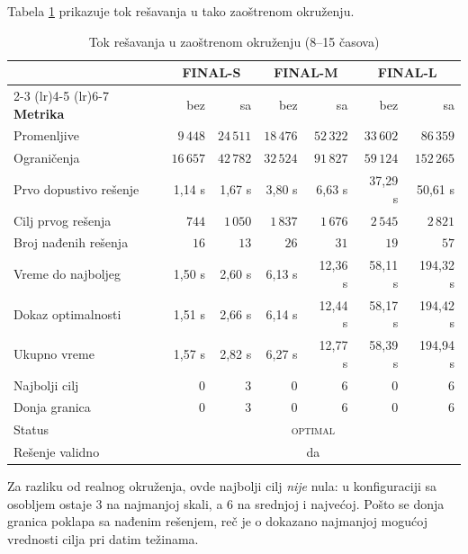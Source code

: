 \documentclass[12pt,oneside]{memoir}
\begin{document}
Tabela \ref{tbl:tight_tok} prikazuje tok rešavanja u tako zaoštrenom
okruženju.

\begin{table}[ht]
\centering
\caption{Tok rešavanja u zaoštrenom okruženju (8--15 časova)}
\label{tbl:tight_tok}
\begin{tabular}{lrrrrrr}
\toprule
& \multicolumn{2}{c}{\textbf{FINAL-S}}
& \multicolumn{2}{c}{\textbf{FINAL-M}}
& \multicolumn{2}{c}{\textbf{FINAL-L}} \\
\cmidrule(lr){2-3} \cmidrule(lr){4-5} \cmidrule(lr){6-7}
\textbf{Metrika} & bez & sa & bez & sa & bez & sa \\
\midrule
Promenljive            & $9\,448$  & $24\,511$ & $18\,476$ & $52\,322$ & $33\,602$ & $86\,359$ \\
Ograničenja            & $16\,657$ & $42\,782$ & $32\,524$ & $91\,827$ & $59\,124$ & $152\,265$ \\
Prvo dopustivo rešenje & 1,14 s    & 1,67 s    & 3,80 s    & 6,63 s    & 37,29 s   & 50,61 s \\
Cilj prvog rešenja     & $744$     & $1\,050$  & $1\,837$  & $1\,676$  & $2\,545$  & $2\,821$ \\
Broj nađenih rešenja   & $16$      & $13$      & $26$      & $31$      & $19$      & $57$ \\
Vreme do najboljeg     & 1,50 s    & 2,60 s    & 6,13 s    & 12,36 s   & 58,11 s   & 194,32 s \\
Dokaz optimalnosti     & 1,51 s    & 2,66 s    & 6,14 s    & 12,44 s   & 58,17 s   & 194,42 s \\
Ukupno vreme           & 1,57 s    & 2,82 s    & 6,27 s    & 12,77 s   & 58,39 s   & 194,94 s \\
Najbolji cilj          & $0$       & $3$       & $0$       & $6$       & $0$       & $6$ \\
Donja granica          & $0$       & $3$       & $0$       & $6$       & $0$       & $6$ \\
Status                 & \multicolumn{6}{c}{\textsc{optimal}} \\
Rešenje validno        & \multicolumn{6}{c}{da} \\
\bottomrule
\end{tabular}
\end{table}

Za razliku od realnog okruženja, ovde najbolji cilj \emph{nije} nula:
u konfiguraciji sa osobljem ostaje 3 na najmanjoj skali, a 6 na srednjoj
i najvećoj. Pošto se donja granica poklapa sa nađenim rešenjem, reč je o
dokazano najmanjoj mogućoj vrednosti cilja pri datim težinama.
\end{document}
